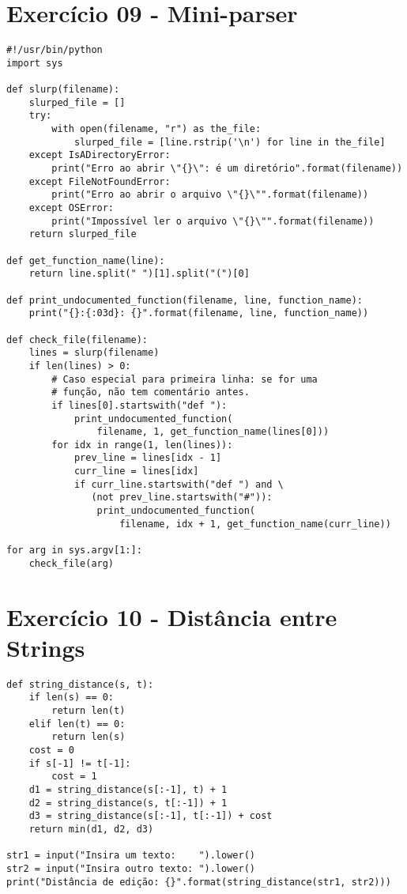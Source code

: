 \documentclass[article, a4paper, oneside, 11pt, english, brazil, sumario=tradicional]{abntex2}
\begin{document}
\newpage
\section{Exercício 09 - Mini-parser}
\label{sec:org772dc64}

\begin{verbatim}
#!/usr/bin/python
import sys

def slurp(filename):
    slurped_file = []
    try:
        with open(filename, "r") as the_file:
            slurped_file = [line.rstrip('\n') for line in the_file]
    except IsADirectoryError:
        print("Erro ao abrir \"{}\": é um diretório".format(filename))
    except FileNotFoundError:
        print("Erro ao abrir o arquivo \"{}\"".format(filename))
    except OSError:
        print("Impossível ler o arquivo \"{}\"".format(filename))
    return slurped_file

def get_function_name(line):
    return line.split(" ")[1].split("(")[0]

def print_undocumented_function(filename, line, function_name):
    print("{}:{:03d}: {}".format(filename, line, function_name))

def check_file(filename):
    lines = slurp(filename)
    if len(lines) > 0:
        # Caso especial para primeira linha: se for uma
        # função, não tem comentário antes.
        if lines[0].startswith("def "):
            print_undocumented_function(
                filename, 1, get_function_name(lines[0]))
        for idx in range(1, len(lines)):
            prev_line = lines[idx - 1]
            curr_line = lines[idx]
            if curr_line.startswith("def ") and \
               (not prev_line.startswith("#")):
                print_undocumented_function(
                    filename, idx + 1, get_function_name(curr_line))

for arg in sys.argv[1:]:
    check_file(arg)
\end{verbatim}

\newpage
\section{Exercício 10 - Distância entre Strings}
\label{sec:org71a3252}

\begin{verbatim}
def string_distance(s, t):
    if len(s) == 0:
        return len(t)
    elif len(t) == 0:
        return len(s)
    cost = 0
    if s[-1] != t[-1]:
        cost = 1
    d1 = string_distance(s[:-1], t) + 1
    d2 = string_distance(s, t[:-1]) + 1
    d3 = string_distance(s[:-1], t[:-1]) + cost
    return min(d1, d2, d3)

str1 = input("Insira um texto:    ").lower()
str2 = input("Insira outro texto: ").lower()
print("Distância de edição: {}".format(string_distance(str1, str2)))
\end{verbatim}
\end{document}
